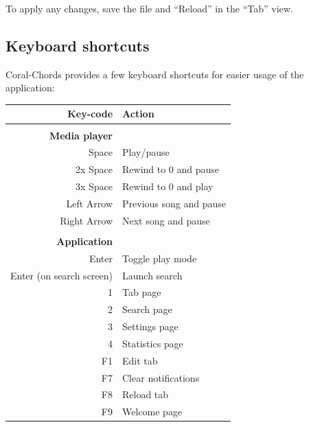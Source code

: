 \documentclass[12pt, a4paper]{article}
\begin{document}
                                To apply any changes, save the file and ``Reload'' in the ``Tab'' view.
                \subsection{Keyboard shortcuts}
                        \raggedright { 
                                Coral-Chords provides a few keyboard shortcuts for easier usage of the application:\break

                        }
                        \begin{tabular}{r l}
                                Key-code & Action\\
                                \hline\\
                                \textbf{Media player}\\
                                Space & Play/pause\\
                                2x Space & Rewind to 0 and pause\\
                                3x Space & Rewind to 0 and play\\
                                Left Arrow & Previous song and pause\\
                                Right Arrow & Next song and pause\\
                                \\
                                \textbf{Application}\\
                                Enter & Toggle play mode\\
                                Enter (on search screen) & Launch search\\
                                1 & Tab page\\
                                2 & Search page\\
                                3 & Settings page\\
                                4 & Statistics page\\
                                F1 & Edit tab\\
                                F7 & Clear notifications\\ 
                                F8 & Reload tab\\
                                F9 & Welcome page\\
                        \end{tabular}
\end{document}
